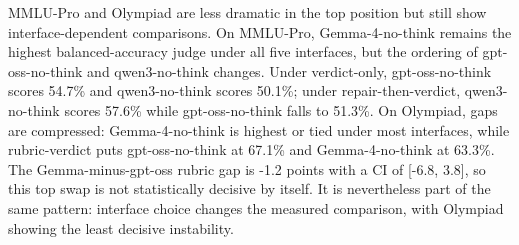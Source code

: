 \documentclass[journal]{IEEEtran}
\begin{document}
MMLU-Pro and Olympiad are less dramatic in the top position but still show interface-dependent comparisons. On MMLU-Pro, Gemma-4-no-think remains the highest balanced-accuracy judge under all five interfaces, but the ordering of gpt-oss-no-think and qwen3-no-think changes. Under verdict-only, gpt-oss-no-think scores 54.7\% and qwen3-no-think scores 50.1\%; under repair-then-verdict, qwen3-no-think scores 57.6\% while gpt-oss-no-think falls to 51.3\%. On Olympiad, gaps are compressed: Gemma-4-no-think is highest or tied under most interfaces, while rubric-verdict puts gpt-oss-no-think at 67.1\% and Gemma-4-no-think at 63.3\%. The Gemma-minus-gpt-oss rubric gap is -1.2 points with a CI of [-6.8, 3.8], so this top swap is not statistically decisive by itself. It is nevertheless part of the same pattern: interface choice changes the measured comparison, with Olympiad showing the least decisive instability.

\begin{table}[t]
\centering
\footnotesize
\setlength{\tabcolsep}{3pt}
\caption{Per-dataset interface instability summary. ``GEE terms'' counts significant judge-by-interface terms in the per-dataset GEE model of verdict correctness, as frozen in paper/tables/ifc\_gee\_summary.csv. Kendall $\tau$ is the minimum rank correlation between any two interface-specific judge rankings within the dataset. The analyzable pool removes only uniform context-overflow exclusions before judge-specific non-verdicts.}
\label{tab:ifc-dataset-summary}
\end{table}
\end{document}
